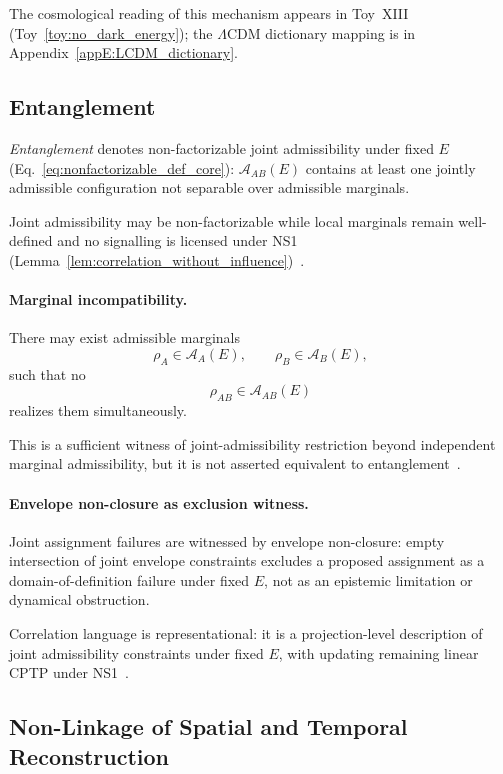 \documentclass[aps,prx,onecolumn,11pt]{revtex4-2}
\theoremstyle{plain}
\theoremstyle{definition}
\theoremstyle{remark}
\begin{document}
The cosmological reading of this mechanism appears in Toy~XIII
(Toy~\ref{toy:no_dark_energy}); the \(\Lambda\)CDM dictionary
mapping is in Appendix~\ref{appE:LCDM_dictionary}.

\subsection{Entanglement}
\label{subsec:entanglement}

\emph{Entanglement} denotes non-factorizable joint admissibility under
fixed \(E\) (Eq.~\eqref{eq:nonfactorizable_def_core}):
\(\mathcal{A}_{AB}(E)\) contains at least one jointly admissible
configuration not separable over admissible marginals.

Joint admissibility may be non-factorizable while local marginals
remain well-defined and no signalling is licensed under NS1
(Lemma~\ref{lem:correlation_without_influence})~\cite{Horodecki2009,
Watrous2018}.

\paragraph{Marginal incompatibility.}

There may exist admissible marginals
\[
\rho_A\in\mathcal{A}_A(E),
\qquad
\rho_B\in\mathcal{A}_B(E),
\]
such that no
\[
\rho_{AB}\in\mathcal{A}_{AB}(E)
\]
realizes them simultaneously.

This is a sufficient witness of joint-admissibility restriction beyond
independent marginal admissibility, but it is not asserted equivalent to
entanglement~\cite{Horodecki2009,Watrous2018}.

\paragraph{Envelope non-closure as exclusion witness.}

Joint assignment failures are witnessed by envelope non-closure: empty
intersection of joint envelope constraints excludes a proposed
assignment as a domain-of-definition failure under fixed \(E\), not as
an epistemic limitation or dynamical obstruction.

Correlation language is representational: it is a projection-level
description of joint admissibility constraints under fixed \(E\), with
updating remaining linear CPTP under NS1~\cite{Bell1964,Horodecki2009,
NielsenChuang2010,Watrous2018}.

\subsection{Non-Linkage of Spatial and Temporal Reconstruction}
\label{subsec:nonlinkage_space_time}
\end{document}
